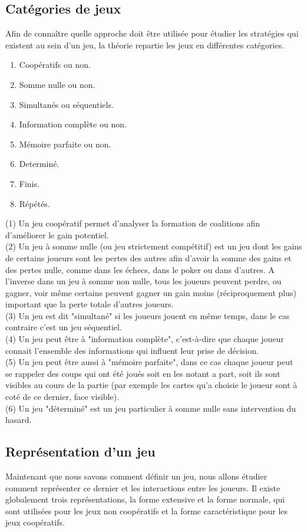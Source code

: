 \documentclass[a4paper, 12pt, french]{article}
\begin{document}
	\subsection{Catégories de jeux}
	Afin de connaître quelle approche doit être utilisée pour étudier les stratégies qui existent au sein d'un jeu,
	la théorie repartie les jeux en différentes catégories\cite{wiki_typo_theorie_jeux}.
	\begin{enumerate}
		\item Coopératifs ou non.
		\item Somme nulle ou non.
		\item Simultanés ou séquentiels.
		\item Information complète ou non.
		\item Mémoire parfaite ou non.
		\item Determiné.
		\item Finis.
		\item Répétés.
	\end{enumerate}
	(1) Un jeu coopératif permet d'analyser la formation de coalitions afin d'améliorer le gain potentiel. \\
	(2) Un jeu à somme nulle (ou jeu strictement compétitif) est un jeu dont les gains de certains joueurs
	sont les pertes des autres afin d'avoir la somme des gains et des pertes nulle, comme dans les échecs,
	dans le poker ou dans d'autres. A l'inverse dans un jeu à somme non nulle, tous les joueurs peuvent perdre,
	ou gagner, voir même certains peuvent gagner un gain moins (réciproquement plus) important que la perte totale
	d'autres joueurs.\\
	(3) Un jeu est dit "simultané" si les joueurs jouent en même temps, dans le cas contraire c'est un jeu séquentiel.\\
	(4) Un jeu peut être à "information complète", c'est-à-dire que chaque joueur connait l'ensemble des informations
	qui influent leur prise de décision.\\
	(5) Un jeu peut être aussi à "mémoire parfaite", dans ce cas chaque joueur peut se rappeler des coups qui ont été
	joués soit en les notant a part, soit ils sont visibles au cours de la partie (par exemple les cartes qu'a choisie
	le joueur sont à coté de ce dernier, face visible).\\
	(6) Un jeu "déterminé" est un jeu particulier à somme nulle sans intervention du hasard.

	\subsection{Représentation d'un jeu}
	Maintenant que nous savons comment définir un jeu, nous allons étudier comment représenter ce dernier et les
	interactions entre les joueurs. Il existe globalement trois représentations\cite{wiki_representation_theorie_jeux},
	la forme extensive et la forme normale, qui sont utilisées pour les jeux non coopératifs et
	la forme caractéristique pour les jeux coopératifs.
\end{document}
